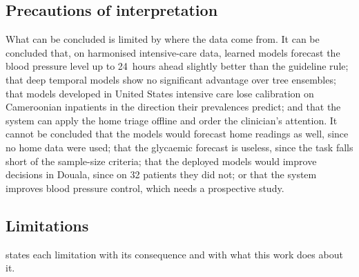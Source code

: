 \documentclass[11pt,a4paper,oneside]{report}
\begin{document}
\subsection{Precautions of interpretation}\label{sec:precautions}

What can be concluded is limited by where the data come from. It can be concluded that, on harmonised intensive-care data, learned models forecast the blood pressure level up to 24~hours ahead slightly better than the guideline rule; that deep temporal models show no significant advantage over tree ensembles; that models developed in United States intensive care lose calibration on Cameroonian inpatients in the direction their prevalences predict; and that the system can apply the home triage offline and order the clinician's attention. It cannot be concluded that the models would forecast home readings as well, since no home data were used; that the glycaemic forecast is useless, since the task falls short of the sample-size criteria; that the deployed models would improve decisions in Douala, since on 32 patients they did not; or that the system improves blood pressure control, which needs a prospective study.

\subsection{Limitations}\label{sec:limitations}

 states each limitation with its consequence and with what this work does about it.
\end{document}
